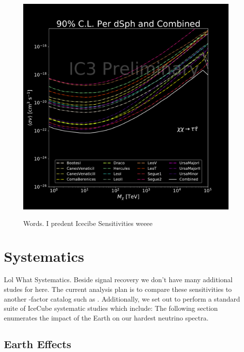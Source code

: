 \begin{figure}[b]
{        \includegraphics[scale=0.275]{figures/ic_DM/dm_plots/tautau_money_plot_comb.pdf}
    }
    \caption{Words. I predent Icecibe Sensitivities weeee}
    \label{fig:icDM_sensitivity_2of2}
\end{figure}

\section{Systematics} \label{sec:icDM_Systematics}

Lol What Systematics.
Beside signal recovery we don't have many additional studes for here.
The current analysis plan is to compare these sensitivities to another \J-factor catalog such as \LS \cite{DM_Strigari20}.
Additionally, we set out to perform a standard suite of IceCube systematic studies which include: 
The following section enumerates the impact of the Earth on our hardest neutrino spectra.

\subsection{Earth Effects} \label{sec:icDM_eart_effects}

